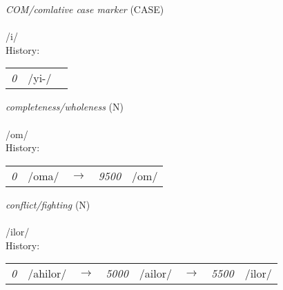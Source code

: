 \vspace{15pt}
\begin{nopagebreak}
 \textit{COM/comlative case marker} (CASE)\\
\\
\noindent /{\textprimstress}i/\\


\noindent History:

\vspace{-0pt}
\hspace{40pt}
\begin{tabular}{ccc}
\textit{0} & /yi-/& \\
\end{tabular}

\vspace{20pt}\hline

\end{nopagebreak}
\filbreak



\vspace{15pt}
\begin{nopagebreak}
 \textit{completeness/wholeness} (N)\\
\\
\noindent /{\textprimstress}om/\\


\noindent History:

\vspace{-0pt}
\hspace{40pt}
\begin{tabular}{ccc}
\textit{0} & /oma/&$\rightarrow$ & \textit{9500} & /om/& \\
\end{tabular}

\vspace{20pt}\hline

\end{nopagebreak}
\filbreak



\vspace{15pt}
\begin{nopagebreak}
 \textit{conflict/fighting} (N)\\
\\
\noindent /{\textprimstress}ilor/\\


\noindent History:

\vspace{-0pt}
\hspace{40pt}
\begin{tabular}{ccc}
\textit{0} & /ahilor/&$\rightarrow$ & \textit{5000} & /ailor/&$\rightarrow$ & \textit{5500} & /ilor/& \\
\end{tabular}

\vspace{20pt}\hline

\end{nopagebreak}
\filbreak



